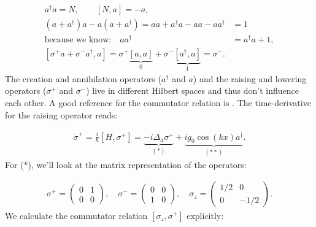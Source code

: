 \begin{align}
a^\dagger a = N, \qquad [N, a] = -a, \\
(a + a^\dagger) a - a (a + a^\dagger) = aa + a^\dagger a - aa - aa^\dagger & = 1 \\
\text{because we know:} \quad aa^\dagger & = a^\dagger a + 1, \nonumber \\
[\sigma^+ a + \sigma^- a^\dagger, a] = \sigma^+ \underbrace{[a, a]}_{0} + \sigma^- \underbrace{[a^\dagger, a]}_{1} = \sigma^-.
\end{align}The creation and annihilation operators ($a^\dagger$ and $a$) and the raising and lowering operators ($\sigma^+$ and $\sigma^-$) live in different Hilbert spaces and thus don't influence each other. A good reference for the commutator relation is \cite{bertlmann}. The time-derivative for the raising operator reads:

\begin{align}
\dot{\sigma}^+ = \frac{i}{\hbar} [H, \sigma^+] = \underbrace{-i \Delta_\text{a} \sigma^+}_{(*)} + \underbrace{i g_0 \cos(kx) a^\dagger}_{(**)}.
\end{align}For ($\ast$), we'll look at the matrix representation of the operators:

\begin{align}
\sigma^+ = \begin{pmatrix}0 & 1 \\ 0 & 0\end{pmatrix}, \quad \sigma^- = \begin{pmatrix}0 & 0 \\ 1 & 0\end{pmatrix}, \quad \sigma_z = \begin{pmatrix}1/2 & 0 \\ 0 & -1/2\end{pmatrix}.
\end{align}We calculate the commutator relation $[\sigma_z, \sigma^+]$ explicitly:

